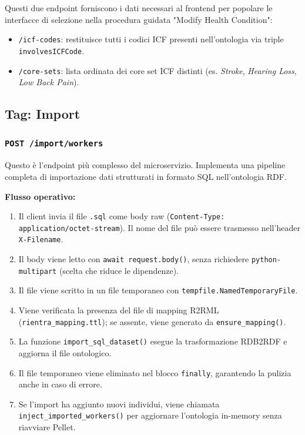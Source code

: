 \documentclass[a4paper,12pt]{article}
\begin{document}
Questi due endpoint forniscono i dati necessari al frontend per
popolare le interfacce di selezione nella procedura guidata "Modify
Health Condition":
\begin{itemize}[noitemsep]
  \item \texttt{/icf-codes}: restituisce tutti i codici ICF presenti
        nell'ontologia via triple \texttt{involvesICFCode}.
  \item \texttt{/core-sets}: lista ordinata dei core set ICF distinti
        (es. \textit{Stroke}, \textit{Hearing Loss}, \textit{Low Back Pain}).
\end{itemize}

\subsection{Tag: Import}

\subsubsection{\texttt{POST /import/workers}}

\begin{infobox}
Questo \`{e} l'endpoint pi\`{u} complesso del microservizio. Implementa una
pipeline completa di importazione dati strutturati in formato SQL
nell'ontologia RDF.
\end{infobox}

\textbf{Flusso operativo:}

\begin{enumerate}
  \item Il client invia il file \texttt{.sql} come body raw
        (\texttt{Content-Type: application/octet-stream}).
        Il nome del file pu\`{o} essere trasmesso nell'header
        \texttt{X-Filename}.
  \item Il body viene letto con \texttt{await request.body()},
        senza richiedere \texttt{python-multipart} (scelta che riduce
        le dipendenze).
  \item Il file viene scritto in un file temporaneo con
        \texttt{tempfile.NamedTemporaryFile}.
  \item Viene verificata la presenza del file di mapping R2RML
        (\texttt{rientra\_mapping.ttl}); se assente, viene generato
        da \texttt{ensure\_mapping()}.
  \item La funzione \texttt{import\_sql\_dataset()} esegue la
        trasformazione RDB2RDF e aggiorna il file ontologico.
  \item Il file temporaneo viene eliminato nel blocco \texttt{finally},
        garantendo la pulizia anche in caso di errore.
  \item Se l'import ha aggiunto nuovi individui, viene chiamata
        \texttt{inject\_imported\_workers()} per aggiornare
        l'ontologia in-memory senza riavviare Pellet.
\end{enumerate}
\end{document}
